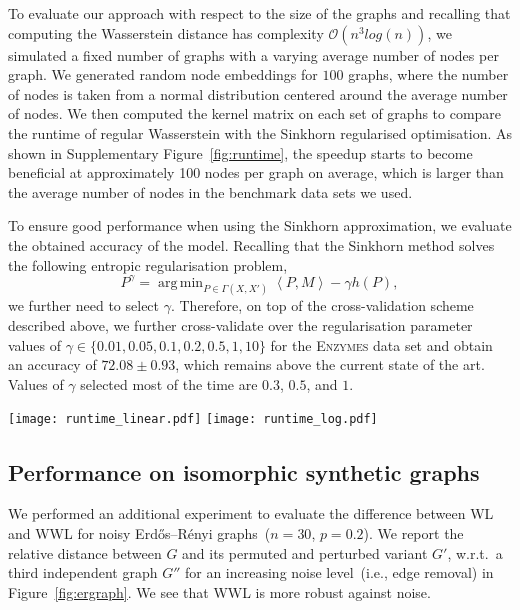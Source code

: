 \documentclass{article}
\DeclareMathOperator*{\argmin}{arg\,min}
\begin{document}
To evaluate our approach with respect to the size of the graphs and recalling that computing the Wasserstein distance has complexity $\mathcal{O}(n^3 log(n))$, we simulated a fixed number of graphs with a varying average number of nodes per graph. We generated random node embeddings for $100$ graphs, where the number of nodes is taken from a normal distribution centered around the average number of nodes. We then computed the kernel matrix on each set of graphs to compare the runtime of regular Wasserstein with the Sinkhorn regularised optimisation. As shown in Supplementary Figure~\ref{fig:runtime}, the speedup starts to become beneficial at approximately 100 nodes per graph on average, which is larger than the average number of nodes in the benchmark data sets we used.

To ensure good performance when using the Sinkhorn approximation, we evaluate the obtained accuracy of the model. 
Recalling that the Sinkhorn method solves the following entropic regularisation problem,
$$P^\gamma = \argmin_{P \in \Gamma(X,X')} \left \langle P, M \right \rangle - \gamma h(P),$$
we further need to select $\gamma$. Therefore, on top of the cross-validation scheme described above, we further cross-validate over the regularisation parameter values of $\gamma \in \{0.01, 0.05, 0.1, 0.2, 0.5, 1, 10\}$ for the \textsc{Enzymes} data set and obtain an accuracy of $72.08 \pm 0.93$, which remains above the current state of the art. Values of $\gamma$ selected most of the time are $0.3$, $0.5$, and $1$.

\begin{figure*}[t]
\vskip 0.2in
  \centering
  \texttt{[image: runtime\_linear.pdf]}
  \texttt{[image: runtime\_log.pdf]}
\caption{Runtime performance of the WWL Kernel computation step with a fixed number of graphs. We also report the time taken to compute the ground distance matrix as $\texttt{distance\_time}$. Here, $\texttt{total\_time}$ is the sum of the time to compute the ground distance and the time taken to solve the optimal transport (ot) problem for the regular solver or the Sinkhorn-regularised one.
The logarithmic scale on the right-side figure shows how, for a small average number of nodes, the overhead to run Sinkhorn is higher than the benefits.}
\label{fig:runtime}
\vskip -0.2in
\end{figure*}


\subsection{Performance on isomorphic synthetic graphs}
\label{app:isomorphic}
We performed an additional experiment to evaluate the difference between WL and WWL for noisy  Erd\H{o}s--R\'enyi graphs~($n = 30$, $p = 0.2$). We report the relative distance between $G$ and its permuted and perturbed variant $G'$, w.r.t.\ a third independent graph $G''$ for an increasing noise level~(i.e., edge removal) in Figure~\ref{fig:ergraph}. We see that WWL is more robust against noise. 
\end{document}
